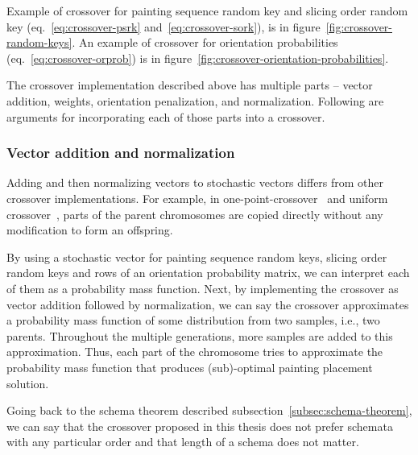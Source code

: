 Example of crossover for painting sequence random key and slicing order random key (eq.~\ref{eq:crossover-psrk} and~\ref{eq:crossover-sork}),
is in figure~\ref{fig:crossover-random-keys}.
An example of crossover for orientation probabilities (eq.~\ref{eq:crossover-orprob}) is in figure~\ref{fig:crossover-orientation-probabilities}.

The crossover implementation described above has multiple parts – vector addition, weights, orientation penalization, and normalization.
Following are arguments for incorporating each of those parts into a crossover.

\subsubsection*{Vector addition and normalization}

Adding and then normalizing vectors to stochastic vectors differs from other crossover implementations.
For example, in one-point-crossover~\cite{hollandAdaptationNaturalArtificial1975} and
uniform crossover~\cite{uniformCrossover1989}, parts of the parent chromosomes are copied directly without any modification to form an offspring.

By using a stochastic vector for painting sequence random keys, slicing order random keys and rows of an orientation probability matrix,
we can interpret each of them as a probability mass function.
Next, by implementing the crossover as vector addition followed by normalization, we can
say the crossover approximates a probability mass function of some distribution from two samples, i.e., two parents.
Throughout the multiple generations, more samples are added to this approximation.
Thus, each part of the chromosome tries to approximate the probability mass function
that produces (sub)-optimal painting placement solution.

Going back to the schema theorem described subsection~\ref{subsec:schema-theorem},
we can say that the crossover proposed in this thesis does not prefer schemata with any particular order
and that length of a schema does not matter.

